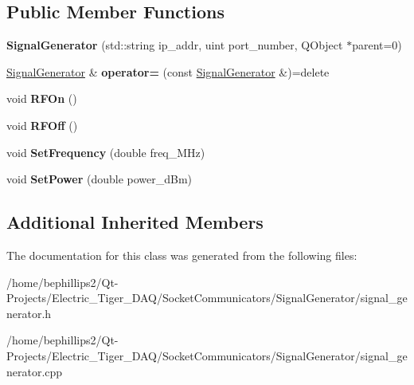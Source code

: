 \subsection*{Public Member Functions}
\begin{DoxyCompactItemize}
\item 
{\bfseries Signal\+Generator} (std\+::string ip\+\_\+addr, uint port\+\_\+number, Q\+Object $\ast$parent=0)\hypertarget{class_signal_generator_a99405c3ab5e58876967fe4f7d34f84b3}{}\label{class_signal_generator_a99405c3ab5e58876967fe4f7d34f84b3}

\item 
\hyperlink{class_signal_generator}{Signal\+Generator} \& {\bfseries operator=} (const \hyperlink{class_signal_generator}{Signal\+Generator} \&)=delete\hypertarget{class_signal_generator_a4ee427365a76d62d3645f707cf1baf72}{}\label{class_signal_generator_a4ee427365a76d62d3645f707cf1baf72}

\item 
void {\bfseries R\+F\+On} ()\hypertarget{class_signal_generator_a55fbb51b7bd6b3cef69689eb8a63f0f9}{}\label{class_signal_generator_a55fbb51b7bd6b3cef69689eb8a63f0f9}

\item 
void {\bfseries R\+F\+Off} ()\hypertarget{class_signal_generator_a2f277765a848fe7640fae5b3d79c1714}{}\label{class_signal_generator_a2f277765a848fe7640fae5b3d79c1714}

\item 
void {\bfseries Set\+Frequency} (double freq\+\_\+\+M\+Hz)\hypertarget{class_signal_generator_a9ad69641992a00ef027682d5391df8e8}{}\label{class_signal_generator_a9ad69641992a00ef027682d5391df8e8}

\item 
void {\bfseries Set\+Power} (double power\+\_\+d\+Bm)\hypertarget{class_signal_generator_a319e0ca196dd341b1aab276626a729f3}{}\label{class_signal_generator_a319e0ca196dd341b1aab276626a729f3}

\end{DoxyCompactItemize}
\subsection*{Additional Inherited Members}


The documentation for this class was generated from the following files\+:\begin{DoxyCompactItemize}
\item 
/home/bephillips2/\+Qt-\/\+Projects/\+Electric\+\_\+\+Tiger\+\_\+\+D\+A\+Q/\+Socket\+Communicators/\+Signal\+Generator/signal\+\_\+generator.\+h\item 
/home/bephillips2/\+Qt-\/\+Projects/\+Electric\+\_\+\+Tiger\+\_\+\+D\+A\+Q/\+Socket\+Communicators/\+Signal\+Generator/signal\+\_\+generator.\+cpp\end{DoxyCompactItemize}
